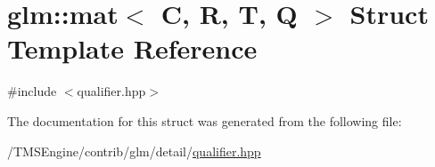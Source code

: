 \hypertarget{structglm_1_1mat}{}\section{glm\+:\+:mat$<$ C, R, T, Q $>$ Struct Template Reference}
\label{structglm_1_1mat}


{\ttfamily \#include $<$qualifier.\+hpp$>$}



The documentation for this struct was generated from the following file\+:\begin{DoxyCompactItemize}
\item 
/\+T\+M\+S\+Engine/contrib/glm/detail/\hyperlink{qualifier_8hpp}{qualifier.\+hpp}\end{DoxyCompactItemize}
